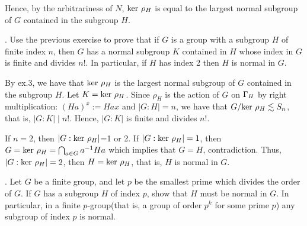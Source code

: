 \documentclass[12pt]{amsart}
\def\r{\rho} \def\o{\sigma} \def\t{\tau} \def\w{\omega} \def\k{\kappa}
\def\m{\medskip} \def\l{\noindent} \def\x{$\!\,$} \def\J{$-\!\,$}
\def\pf{\noindent {\it Proof.\ }}
\begin{document}
Hence, by the arbitrariness of $N$, ${\rm ker}\ \r_H$ is equal to the largest normal subgroup of $G$ contained in the subgroup $H$.

\m

\l 4. Use the previous exercise to prove that if $G$ is a group with a subgroup $H$ of finite index $n$, then $G$ has a normal subgroup $K$ contained in $H$ whose index in $G$ is finite and divides $n!$. In particular, if $H$ has index 2 then $H$ is normal in $G$.

\pf By ex.3, we have that ${\rm ker}\ \r_H$ is the largest normal subgroup of $G$ contained in the subgroup $H$. 
Let $K= {\rm ker}\ \r_H$.
Since $\r_H$ is the action of $G$ on $\Gamma_H$ by right multiplication: $(Ha)^x:=Hax$ and $|G:H|=n$, we have that $G/ {\rm ker}\ \r_H \lesssim S_n$, that is, $|G:K|\mid n!$.
Hence, $|G:K|$ is finite and divides $n!$.

If $n=2$, then $|G:{\rm ker}\ \r_H|$=1 or 2. If $|G:{\rm ker}\ \r_H|=1$, then $G={\rm ker}\ \r_H=\bigcap_{a\in G}a^{-1}Ha$ which implies that $G=H$, contradiction. Thus, $|G:{\rm ker}\ \r_H|=2$, then $H={\rm ker}\ \r_H$, that is, $H$ is normal in $G$.

\m

\l 5. Let $G$ be a finite group, and let $p$ be the smallest prime which divides the order of $G$. If $G$ has a subgroup $H$ of index $p$, show that $H$ must be normal in $G$. In particular, in a finite $p$-group(that is, a group of order $p^k$ for some prime $p$) any subgroup of index $p$ is normal.
\end{document}

